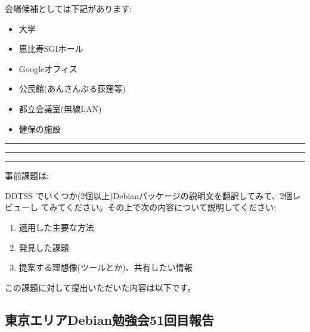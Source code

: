 \documentclass[mingoth,a4paper]{jsarticle}
\begin{document}
\begin{multicols}{2}
 会場候補としては下記があります:

 \begin{itemize}
  \item 大学
  \item 恵比寿SGIホール
  \item Googleオフィス
  \item 公民館(あんさんぶる荻窪等)
  \item 都立会議室(無線LAN)
  \item 健保の施設
 \end{itemize}

\end{multicols}


\newpage

\begin{minipage}[b]{0.2\hsize}
 \colorbox{titleback}{}
\end{minipage}
\begin{minipage}[b]{0.8\hsize}
\hrule
\vspace{2mm}
\hrule

\setcounter{tocdepth}{1}
\tableofcontents
\vspace{2mm}
\hrule
\end{minipage}


事前課題は:

DDTSS
でいくつか(2個以上)Debianパッケージの説明文を翻訳してみて、2個レビューし
てみてください。その上で次の内容について説明してください:

\begin{enumerate}
 \item 適用した主要な方法
 \item 発見した課題
 \item 提案する理想像(ツールとか)、共有したい情報
\end{enumerate}

この課題に対して提出いただいた内容は以下です。

\begin{multicols}{2}

\end{multicols}

%
%

\subsection{東京エリアDebian勉強会51回目報告}
\end{document}
